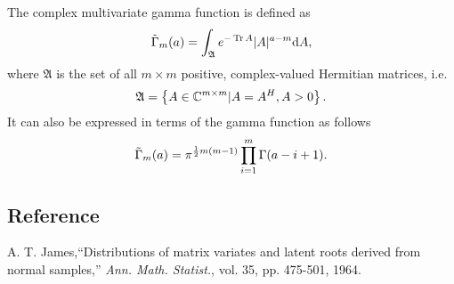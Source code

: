 \documentclass[12pt]{article}
\DeclareMathOperator{\Tr}{Tr}
\begin{document}
The complex multivariate gamma function is defined as
\begin{equation}
\tilde{\Gamma}_m(a)=\int_{\mathfrak{A}} e^{-\Tr A}|A|^{a-m} {\rm d}A,
\end{equation}
where $ \mathfrak{A}$ is the set of all $ m \times m$ positive, complex-valued Hermitian matrices, i.e.
\begin{equation}
\mathfrak{A} = \left\{A \in \Bbb{C}^{m \times m} | A = A^H, A > 0\right\}.
\end{equation}
It can also be expressed in terms of the gamma function as follows
\begin{equation}
\tilde{\Gamma}_m(a)=\pi^{{1 \over 2}m(m-1)} \prod\limits_{i=1}^{m}\Gamma(a-i+1).
\end{equation}

\subsection*{Reference}
A. T. James,``Distributions of matrix variates and latent roots derived from normal samples,'' {\it Ann. Math. Statist.}, vol. 35, pp. 475-501, 1964.
\end{document}
